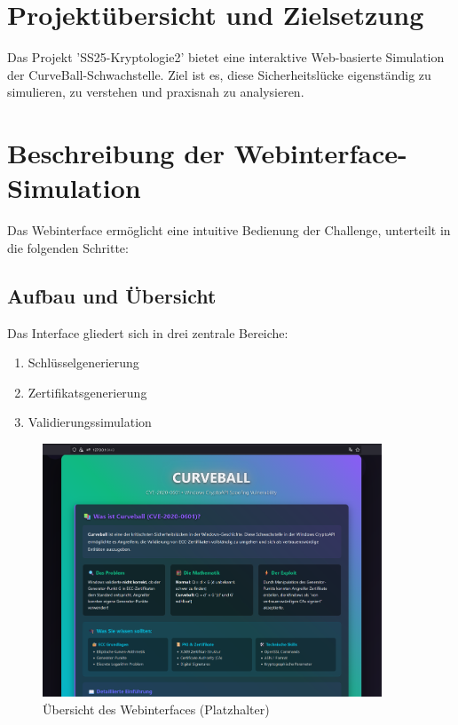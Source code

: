 \documentclass{article}
\begin{document}
\section{Projektübersicht und Zielsetzung}
Das Projekt 'SS25-Kryptologie2' bietet eine interaktive Web-basierte Simulation der CurveBall-Schwachstelle. Ziel ist es, diese Sicherheitslücke eigenständig zu simulieren, zu verstehen und praxisnah zu analysieren.

\section{Beschreibung der Webinterface-Simulation}
Das Webinterface ermöglicht eine intuitive Bedienung der Challenge, unterteilt in die folgenden Schritte:

\subsection{Aufbau und Übersicht}
Das Interface gliedert sich in drei zentrale Bereiche:

\begin{enumerate}
    \item Schlüsselgenerierung
    \item Zertifikatsgenerierung
    \item Validierungssimulation
\end{enumerate}

\begin{figure}[h]
\centering
\includegraphics[width=0.9\textwidth]{webinterface_overview.png}
\caption{Übersicht des Webinterfaces (Platzhalter)}
\end{figure}
\end{document}
